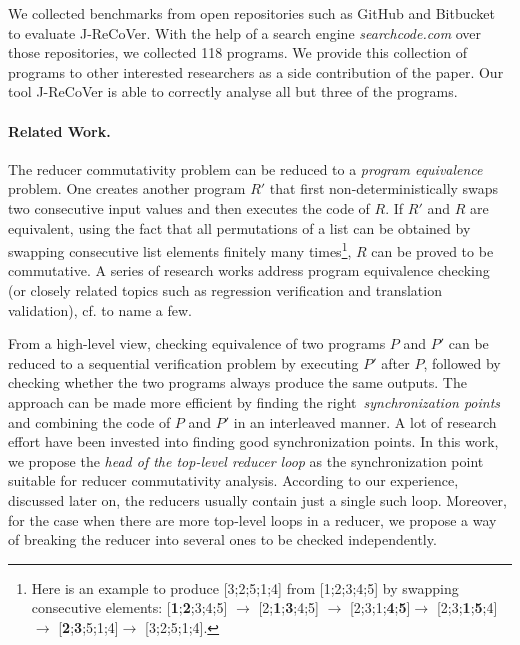 \documentclass{llncs}
\begin{document}
We collected benchmarks from open repositories such as GitHub and Bitbucket to
evaluate J-ReCoVer. With the help of a search engine \emph{searchcode.com} over
those repositories, we collected 118 programs. We provide this collection of
programs to other interested researchers as a side contribution of the paper.
Our tool J-ReCoVer is able to correctly analyse all but three of the programs.

\paragraph*{Related Work.}

The reducer commutativity problem can be reduced to a \emph{program equivalence}
problem. One creates another program $R'$ that first non-deterministically swaps
two consecutive input values and then executes the code of $R$. If $R'$ and $R$
are equivalent, using the fact that all permutations of a list can be obtained
by swapping consecutive list elements finitely many times\footnote{Here is an
example to produce [3;2;5;1;4] from [1;2;3;4;5] by swapping consecutive
elements: [\textbf{1};\textbf{2};3;4;5] $\rightarrow$
[2;\textbf{1};\textbf{3};4;5] $\rightarrow$
[2;3;1;\textbf{4};\textbf{5}]$\rightarrow$
[2;3;\textbf{1};\textbf{5};4]$\rightarrow$
[\textbf{2};\textbf{3};5;1;4]$\rightarrow$ [3;2;5;1;4].}, $R$ can be proved to
be commutative. A series of research works address program equivalence
checking (or closely related topics such as regression verification and
translation validation), cf.
\cite{Pnueli:1998:TV,fedyukovich2015automated,barthe2011relational,KlebanovRuemmerUlbrich2017}
to name a few. 

From a high-level view, checking equivalence of two programs $P$ and $P'$ can be
reduced to a sequential verification problem by executing $P'$ after $P$,
followed by checking whether the two programs always produce the same outputs.
The approach can be made more efficient by finding the
right~\emph{synchronization points} and combining the code of $P$ and $P'$ in an
interleaved manner. A lot of research effort have been invested into finding
good synchronization points. In this work, we propose the \emph{head of the
top-level reducer loop} as the synchronization point suitable for reducer
commutativity analysis. According to our experience, discussed later on, the
reducers usually contain just a single such loop. Moreover, for the case when
there are more top-level loops in a reducer, we propose a way of breaking the 
reducer into several ones to be checked independently.
\end{document}
